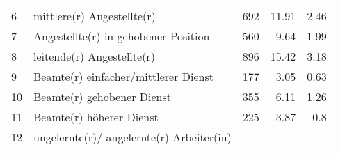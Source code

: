 \begin{longtable}{lXrrr}
     6 &
     \multicolumn{1}{X}{ mittlere(r) Angestellte(r)   } &


       \num{692} &
       \num[round-mode=places,round-precision=2]{11,91} &
         \num[round-mode=places,round-precision=2]{2,46} \\

     7 &
     \multicolumn{1}{X}{ Angestellte(r) in gehobener Position   } &


       \num{560} &
       \num[round-mode=places,round-precision=2]{9,64} &
         \num[round-mode=places,round-precision=2]{1,99} \\

     8 &
     \multicolumn{1}{X}{ leitende(r) Angestellte(r)   } &


       \num{896} &
       \num[round-mode=places,round-precision=2]{15,42} &
         \num[round-mode=places,round-precision=2]{3,18} \\

     9 &
     \multicolumn{1}{X}{ Beamte(r) einfacher/mittlerer Dienst   } &


       \num{177} &
       \num[round-mode=places,round-precision=2]{3,05} &
         \num[round-mode=places,round-precision=2]{0,63} \\

     10 &
     \multicolumn{1}{X}{ Beamte(r) gehobener Dienst   } &


       \num{355} &
       \num[round-mode=places,round-precision=2]{6,11} &
         \num[round-mode=places,round-precision=2]{1,26} \\

     11 &
     \multicolumn{1}{X}{ Beamte(r) höherer Dienst   } &


       \num{225} &
       \num[round-mode=places,round-precision=2]{3,87} &
         \num[round-mode=places,round-precision=2]{0,8} \\

     12 &
     \multicolumn{1}{X}{ ungelernte(r)/ angelernte(r) Arbeiter(in)   } &



\end{longtable}
